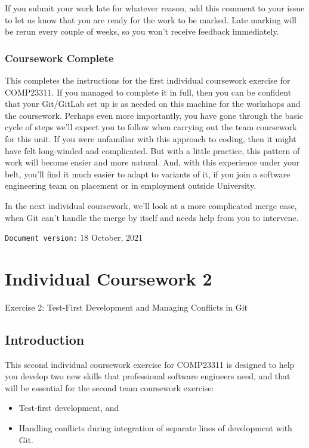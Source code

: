 \documentclass[
]{book}
\providecommand{\tightlist}{%
  \setlength{\itemsep}{0pt}\setlength{\parskip}{0pt}}
\begin{document}
If you submit your work late for whatever reason, add this comment to your issue to let us know that you are ready for the work to be marked. Late marking will be rerun every couple of weeks, so you won't receive feedback immediately.

\hypertarget{gameover}{%
\subsection{Coursework Complete}\label{gameover}}

This completes the instructions for the first individual coursework exercise for COMP23311. If you managed to complete it in full, then you can be confident that your Git/GitLab set up is as needed on this machine for the workshops and the coursework. Perhaps even more importantly, you have gone through the basic cycle of steps we'll expect you to follow when carrying out the team coursework for this unit. If you were unfamiliar with this approach to coding, then it might have felt long-winded and complicated. But with a little practice, this pattern of work will become easier and more natural. And, with this experience under your belt, you'll find it much easier to adapt to variants of it, if you join a software engineering team on placement or in employment outside University.

In the next individual coursework, we'll look at a more complicated merge case, when Git can't handle the merge by itself and needs help from you to intervene.

\texttt{Document\ version:} 18 October, 2021

\hypertarget{conflicting}{%
\chapter{Individual Coursework 2}\label{conflicting}}

Exercise 2: Test-First Development and Managing Conflicts in Git

\hypertarget{introt}{%
\section{Introduction}\label{introt}}

This second individual coursework exercise for COMP23311 is designed to help you develop two new skills that professional software engineers need, and that will be essential for the second team coursework exercise:

\begin{itemize}
\tightlist
\item
  Test-first development, and
\item
  Handling conflicts during integration of separate lines of development with Git.
\end{itemize}
\end{document}
